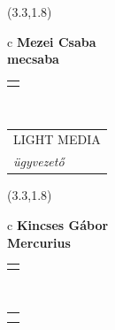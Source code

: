 \documentclass[11pt]{article}
\begin{document}
\makebox(3.3,1.8){
  \renewcommand\arraystretch{1.3}
  \begin{tabular}[c]{c}
    \hspace{8.5mm}
    \LARGE\bf{ Mezei Csaba }\\
    \hspace{8.5mm}
    \Large{ mecsaba }\\
    \renewcommand\arraystretch{3}
    \begin{tabular}[c]{c}
      \centering
      \fontfamily{phv}\selectfont{
        \textbf{
          \textsc{
            \scriptsize{
            \color{Dark}{ Ismerkedő }\color{Bright}{ Webmester }\color{Bright}{ Sminkmester }\color{Bright}{ Programozó }
            }
          }
        }
      }
    \end{tabular}
    \\
    \renewcommand\arraystretch{1}
    \begin{tabular}{p{3.3in}}
      \hspace{.7cm}LIGHT MEDIA\\
      \hspace{.7cm}\emph{ ügyvezető }\\
    \end{tabular}
  \end{tabular}
}

\makebox(3.3,1.8){
  \renewcommand\arraystretch{1.3}
  \begin{tabular}[c]{c}
    \hspace{8.5mm}
    \LARGE\bf{ Kincses Gábor }\\
    \hspace{8.5mm}
    \Large{ Mercurius }\\
    \renewcommand\arraystretch{3}
    \begin{tabular}[c]{c}
      \centering
      \fontfamily{phv}\selectfont{
        \textbf{
          \textsc{
            \scriptsize{
            \color{Dark}{ Ismerkedő }\color{Bright}{ Webmester }\color{Dark}{ Sminkmester }\color{Bright}{ Programozó }
            }
          }
        }
      }
    \end{tabular}
    \\
    \renewcommand\arraystretch{1}
    \begin{tabular}{p{3.3in}}
      \hspace{.7cm}\\
      \hspace{.7cm}\emph{  }\\
    \end{tabular}
  \end{tabular}
}
\end{document}
